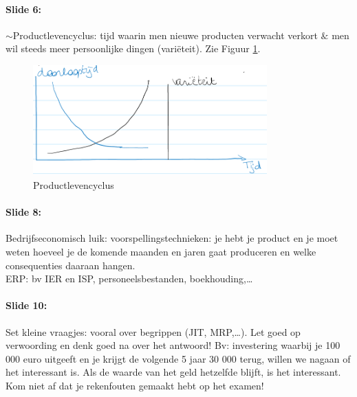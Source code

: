 \documentclass[10pt,a4paper]{report}
\begin{document}
\paragraph{Slide 6:} $\sim$Productlevencyclus: tijd waarin men nieuwe producten verwacht verkort $\&$ men wil steeds meer persoonlijke dingen (vari\"eteit). Zie Figuur \ref{les01_01}.

\begin{figure}[h!]
\centering
\includegraphics[width=90mm]{Les01_01.png}
\caption{Productlevencyclus} 
\label{les01_01}
\end{figure}

\paragraph{Slide 8:} Bedrijfseconomisch luik: voorspellingstechnieken: je hebt je product en je moet weten hoeveel je de komende maanden en jaren gaat produceren en welke consequenties daaraan hangen.\\
ERP: bv IER en ISP, personeelsbestanden, boekhouding,… 

\paragraph{Slide 10:} Set kleine vraagjes: vooral over begrippen (JIT, MRP,…). Let goed op verwoording en denk goed na over het antwoord! Bv: investering waarbij je 100 000 euro uitgeeft en je krijgt de volgende 5 jaar 30 000 terug, willen we nagaan of het interessant is. Als de waarde van het geld hetzelfde blijft, is het interessant. Kom niet af dat je rekenfouten gemaakt hebt op het examen!
\end{document}
